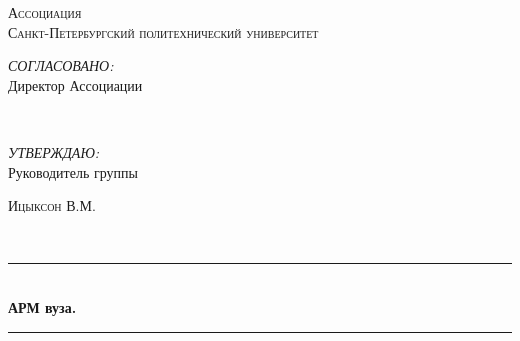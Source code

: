 \begin{titlepage}
\newcommand{\HRule}{\rule{\linewidth}{0.5mm}} %

\center %
 

\textsc{\LARGE Ассоциация }\\[1.5cm] %
\textsc{\Large Санкт-Петербургский политехнический университет}\\[2cm] %


\begin{minipage}{0.4\textwidth}
\begin{flushleft} \large
\emph{СОГЛАСОВАНО:}\\
Директор Ассоциации\\
\end{flushleft}
\end{minipage}
~
\begin{minipage}{0.4\textwidth}
\begin{flushright} \large
\begin{flushleft}
\emph{УТВЕРЖДАЮ:} \\
Руководитель группы\\
\end{flushleft}
\textsc{Ицыксон В.М.}%
\end{flushright}
\end{minipage}\\[4cm]



\HRule \\[0.4cm]
{ \huge \bfseries АРМ вуза. }\\[0.4cm] %
\HRule \\[1.5cm]
 


\end{titlepage}
